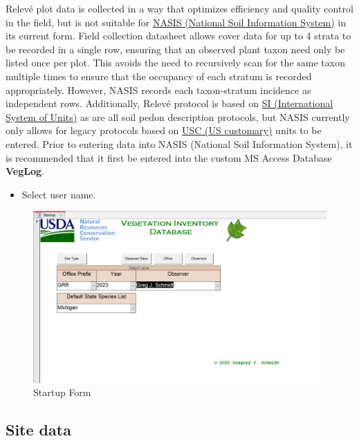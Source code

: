 \documentclass[
]{book}
\providecommand{\tightlist}{%
  \setlength{\itemsep}{0pt}\setlength{\parskip}{0pt}}
\begin{document}
Relevé plot data is collected in a way that optimizes efficiency and quality control in the field, but is not suitable for \href{https://www.nrcs.usda.gov/resources/guides-and-instructions/nasis-user-guides}{NASIS (National Soil Information System)} in its current form. Field collection datasheet allows cover data for up to 4 strata to be recorded in a single row, ensuring that an observed plant taxon need only be listed once per plot. This avoids the need to recursively scan for the same taxon multiple times to ensure that the occupancy of each stratum is recorded appropriately. However, NASIS records each taxon-stratum incidence as independent rows. Additionally, Relevé protocol \citep{dnr2013handbook} is based on \href{https://www.nist.gov/programs-projects/international-system-units-si}{SI (International System of Units)} as are all soil pedon description protocols, but NASIS currently only allows for legacy protocols based on \href{https://www.nist.gov/pml/owm/approximate-conversions-metric-us-customary-measures}{USC (US customary)} units to be entered. Prior to entering data into NASIS (National Soil Information System), it is recommended that it first be entered into the custom MS Access Database \textbf{VegLog}.

\begin{itemize}
\tightlist
\item
  Select user name.
\end{itemize}

\begin{figure}
\centering
\includegraphics{static-figures/veglog1.png}
\caption{Startup Form}
\end{figure}

\hypertarget{site-data}{%
\subsection*{Site data}\label{site-data}}
\end{document}
